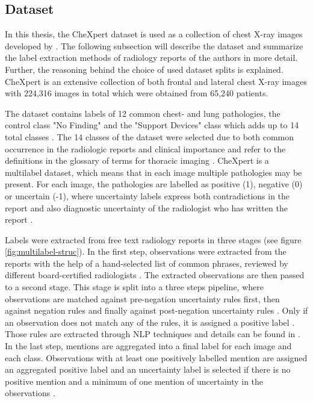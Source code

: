 \subsection{Dataset}
\label{section: dataset}
In this thesis, the CheXpert dataset is used as a collection of chest X-ray images developed by \citep{Irvin2019}.
The following subsection will describe the dataset and summarize the label extraction methods of radiology reports of the authors in more detail.
Further, the reasoning behind the choice of used dataset splits is explained. 
CheXpert is an extensive collection of both frontal and lateral chest X-ray images with 224,316 images in total which were obtained from 65,240 patients.
\par
The dataset contains labels of 12 common chest- and lung pathologies, the control class "No Finding" and the "Support Devices" class which adds up to 14 total classes \citep{Irvin2019}.
The 14 classes of the dataset were selected due to both common occurrence in the radiologic reports and clinical importance \citep{Irvin2019} and refer to the definitions in the glossary of terms for thoracic imaging \citep{Hansell2008}.   
CheXpert is a multilabel dataset, which means that in each image multiple pathologies may be present.
For each image, the pathologies are labelled as positive (1), negative (0) or uncertain (-1), where uncertainty labels express both contradictions in the report and also diagnostic uncertainty of the radiologist who has written the report \citep{Irvin2019}.
\par
Labels were extracted from free text radiology reports in three stages (see figure \ref{fig:multilabel-struc}).
In the first step, observations were extracted from the reports with the help of a hand-selected list of common phrases, reviewed by different board-certified radiologists \citep{Irvin2019}.
The extracted observations are then passed to a second stage.
This stage is split into a three steps pipeline, where observations are matched against pre-negation uncertainty rules first, then against negation rules and finally against post-negation uncertainty rules \citep{Irvin2019}.
Only if an observation does not match any of the rules, it is assigned a positive label \citep{Irvin2019}.
Those rules are extracted through NLP techniques and details can be found in \citep{Irvin2019}.
In the last step, mentions are aggregated into a final label for each image and each class.
Observations with at least one positively labelled mention are assigned an aggregated positive label and an uncertainty label is selected if there is no positive mention and a minimum of one mention of uncertainty in the observations \citep{Irvin2019}.
